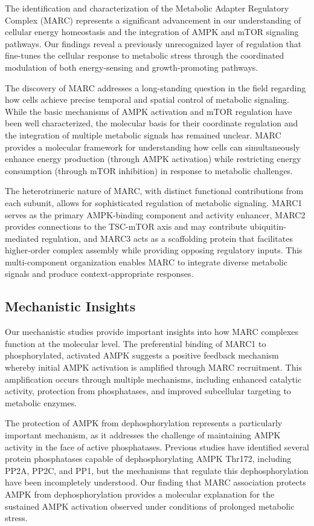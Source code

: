\documentclass[11pt,a4paper]{article}
\begin{document}
The identification and characterization of the Metabolic Adapter Regulatory Complex (MARC) represents a significant advancement in our understanding of cellular energy homeostasis and the integration of AMPK and mTOR signaling pathways. Our findings reveal a previously unrecognized layer of regulation that fine-tunes the cellular response to metabolic stress through the coordinated modulation of both energy-sensing and growth-promoting pathways.

The discovery of MARC addresses a long-standing question in the field regarding how cells achieve precise temporal and spatial control of metabolic signaling. While the basic mechanisms of AMPK activation and mTOR regulation have been well characterized, the molecular basis for their coordinate regulation and the integration of multiple metabolic signals has remained unclear. MARC provides a molecular framework for understanding how cells can simultaneously enhance energy production (through AMPK activation) while restricting energy consumption (through mTOR inhibition) in response to metabolic challenges.

The heterotrimeric nature of MARC, with distinct functional contributions from each subunit, allows for sophisticated regulation of metabolic signaling. MARC1 serves as the primary AMPK-binding component and activity enhancer, MARC2 provides connections to the TSC-mTOR axis and may contribute ubiquitin-mediated regulation, and MARC3 acts as a scaffolding protein that facilitates higher-order complex assembly while providing opposing regulatory inputs. This multi-component organization enables MARC to integrate diverse metabolic signals and produce context-appropriate responses.

\subsection{Mechanistic Insights}

Our mechanistic studies provide important insights into how MARC complexes function at the molecular level. The preferential binding of MARC1 to phosphorylated, activated AMPK suggests a positive feedback mechanism whereby initial AMPK activation is amplified through MARC recruitment. This amplification occurs through multiple mechanisms, including enhanced catalytic activity, protection from phosphatases, and improved subcellular targeting to metabolic enzymes.

The protection of AMPK from dephosphorylation represents a particularly important mechanism, as it addresses the challenge of maintaining AMPK activity in the face of active phosphatases. Previous studies have identified several protein phosphatases capable of dephosphorylating AMPK Thr172, including PP2A, PP2C, and PP1, but the mechanisms that regulate this dephosphorylation have been incompletely understood. Our finding that MARC association protects AMPK from dephosphorylation provides a molecular explanation for the sustained AMPK activation observed under conditions of prolonged metabolic stress.
\end{document}
